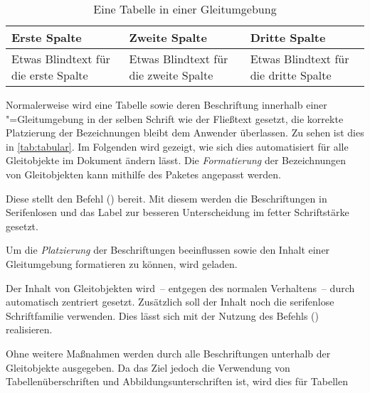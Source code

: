 \documentclass[%
  english,ngerman,%
  cdgeometry=no,DIV=12,automark%
]{tudscrartcl}
\begin{document}
\newcommand*\tableexample[1][]{%
  \begin{tabularx}{.75\textwidth}{@{}XXX@{}}
  \toprule
  \textbf{Erste Spalte} & \textbf{Zweite Spalte} & 
  \textbf{Dritte Spalte} \tabularnewline\midrule
  Etwas Blindtext für die erste Spalte &
  Etwas Blindtext für die zweite Spalte &
  Etwas Blindtext für die dritte Spalte
  \tabularnewline\bottomrule
  \end{tabularx}
  #1%
}
\begin{table}
\tableexample[%
  \caption{Eine Tabelle in einer Gleitumgebung}\label{tab:tabular}%
]
\end{table}

Normalerweise wird eine Tabelle sowie deren Beschriftung innerhalb einer 
"=Gleitumgebung in der selben Schrift wie der Fließtext 
gesetzt, die korrekte Platzierung der Bezeichnungen bleibt dem Anwender 
überlassen. Zu sehen ist dies in \autoref{tab:tabular}. Im Folgenden wird 
gezeigt, wie sich dies automatisiert für alle Gleitobjekte im Dokument ändern 
lässt. Die \emph{Formatierung} der Bezeichnungen von Gleitobjekten kann 
mithilfe des Paketes  angepasst werden.
%
\begin{Preamble}
\usepackage{caption}
\end{Preamble}
%
Diese stellt den Befehl () bereit. Mit 
diesem werden die Beschriftungen in Serifenlosen und das Label zur besseren 
Unterscheidung im fetter Schriftstärke gesetzt.
%
\begin{Preamble*}
\captionsetup{font=sf,labelfont=bf,labelsep=space}
\end{Preamble*}
%
Um die \emph{Platzierung} der Beschriftungen beeinflussen sowie den Inhalt 
einer Gleitumgebung formatieren zu können, wird  geladen. 
\begin{Preamble}
\usepackage{floatrow}
\end{Preamble}
%
Der Inhalt von Gleitobjekten wird~-- entgegen des normalen Verhaltens~-- durch 
 automatisch zentriert gesetzt. Zusätzlich soll der Inhalt 
noch die serifenlose Schriftfamilie verwenden. Dies lässt sich mit der Nutzung 
des Befehls () realisieren.
%
\begin{Preamble*}
\end{Preamble*}
%
Ohne weitere Maßnahmen werden durch  alle Beschriftungen 
unterhalb der Gleitobjekte ausgegeben. Da das Ziel jedoch die Verwendung von 
Tabellenüberschriften und Abbildungsunterschriften ist, wird dies für Tabellen
\end{document}
